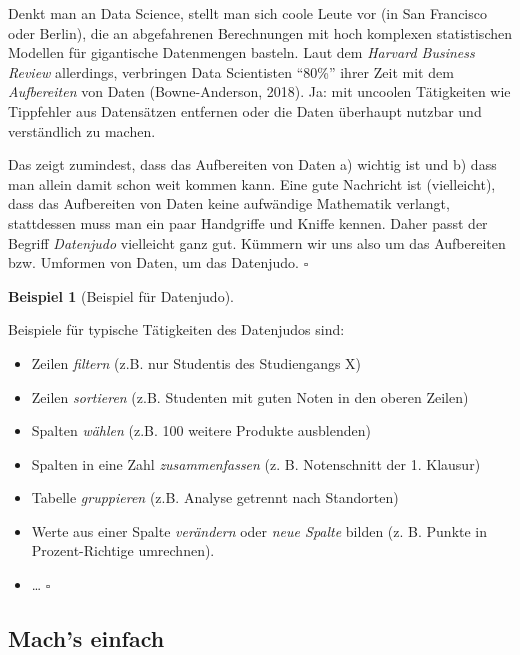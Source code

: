 \documentclass[
  letterpaper,
  twoside,
  open=any]{scrbook}
\providecommand{\tightlist}{%
  \setlength{\itemsep}{0pt}\setlength{\parskip}{0pt}}\usepackage{longtable,booktabs,array}
\theoremstyle{definition}
\theoremstyle{definition}
\theoremstyle{definition}
\newtheorem{example}{Beispiel}[chapter]
\theoremstyle{remark}
\begin{document}
Denkt man an Data Science, stellt man sich coole Leute vor (in San
Francisco oder Berlin), die an abgefahrenen Berechnungen mit hoch
komplexen statistischen Modellen für gigantische Datenmengen basteln.
Laut dem \emph{Harvard Business Review} allerdings, verbringen Data
Scientisten \enquote{80\%} ihrer Zeit mit dem \emph{Aufbereiten} von
Daten (Bowne-Anderson, 2018). Ja: mit uncoolen Tätigkeiten wie
Tippfehler aus Datensätzen entfernen oder die Daten überhaupt nutzbar
und verständlich zu machen.

Das zeigt zumindest, dass das Aufbereiten von Daten a) wichtig ist und
b) dass man allein damit schon weit kommen kann. Eine gute Nachricht ist
(vielleicht), dass das Aufbereiten von Daten keine aufwändige Mathematik
verlangt, stattdessen muss man ein paar Handgriffe und Kniffe kennen.
Daher passt der Begriff \emph{Datenjudo} vielleicht ganz gut. Kümmern
wir uns also um das Aufbereiten bzw. Umformen von Daten, um das
Datenjudo. \(\square\)

\begin{example}[Beispiel für
Datenjudo]\protect\hypertarget{exm-datenjudo}{}\label{exm-datenjudo}

Beispiele für typische Tätigkeiten des Datenjudos sind:

\begin{itemize}
\tightlist
\item
  Zeilen \emph{filtern} (z.B. nur Studentis des Studiengangs X)
\item
  Zeilen \emph{sortieren} (z.B. Studenten mit guten Noten in den oberen
  Zeilen)
\item
  Spalten \emph{wählen} (z.B. 100 weitere Produkte ausblenden)
\item
  Spalten in eine Zahl \emph{zusammenfassen} (z. B. Notenschnitt der 1.
  Klausur)
\item
  Tabelle \emph{gruppieren} (z.B. Analyse getrennt nach Standorten)
\item
  Werte aus einer Spalte \emph{verändern} oder \emph{neue Spalte} bilden
  (z. B. Punkte in Prozent-Richtige umrechnen).
\item
  \ldots{} \(\square\)
\end{itemize}

\end{example}

\subsection{Mach's einfach}\label{machs-einfach}
\end{document}
